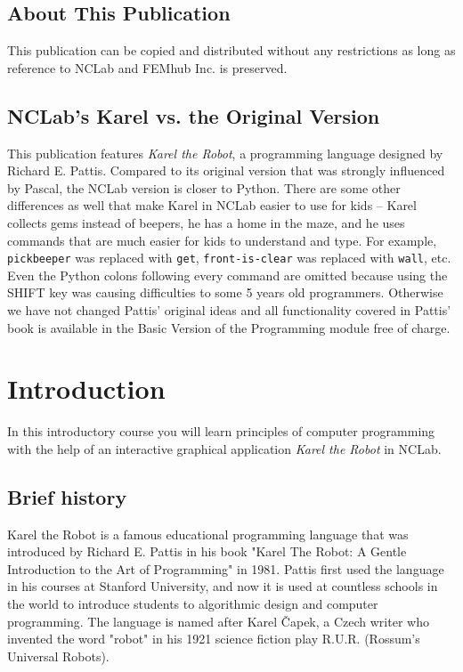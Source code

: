 \documentclass[article,A4,12pt]{llncs}
\begin{document}
\subsection*{About This Publication}
This publication can be copied and distributed without any restrictions
as long as reference to NCLab and FEMhub Inc. is preserved.

\subsection*{NCLab's Karel vs. the Original Version}
This publication features {\em Karel the Robot}, a programming language 
designed by Richard E. Pattis. Compared to its original version that was
strongly influenced by Pascal, the NCLab version is closer to Python.
There are some other differences as well that make Karel in NCLab easier to use 
for kids -- Karel collects gems instead of beepers, he has a home in the 
maze, and he uses commands that are much easier for kids to understand
and type. For example, {\tt pickbeeper} was replaced with {\tt get}, 
{\tt front-is-clear} was replaced with {\tt wall}, etc. Even the Python 
colons following every command are omitted because using the SHIFT key 
was causing difficulties to some 5 years old programmers. 
Otherwise we have not changed Pattis' original ideas and all functionality 
covered in Pattis' book is available in the Basic Version of the Programming
module free of charge. 

\normalsize

\newpage
\setcounter{tocdepth}{2}
\tableofcontents

\newpage

\pagestyle{plain}
\setcounter{page}{1}


\section{Introduction}

In this introductory course you will learn principles of computer programming with the 
help of an interactive graphical application {\em Karel the Robot} in NCLab. 

\subsection{Brief history}

Karel the Robot is a famous educational programming language that was introduced by Richard E. 
Pattis in his book "Karel The Robot: A Gentle Introduction to the Art of Programming" in 1981. 
Pattis first used the language in his courses at Stanford University, and now it is used at 
countless schools in the world to introduce students to algorithmic design and computer programming. 
The language is named after Karel \v{C}apek, a Czech writer who invented the word "robot" in his 1921 
science fiction play R.U.R. (Rossum's Universal Robots).
\end{document}
